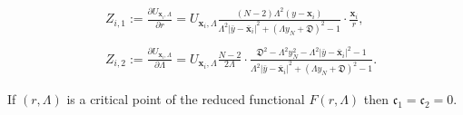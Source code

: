 \documentclass[10pt,a4paper]{amsart}
\begin{document}
\begin{align}\label{eq.Z_i_1_2_expansion_1}
  &Z_{i,1} := \frac{\partial U_{\mathbf{x}_i,\Lambda}}{\partial r} = U_{\mathbf{x}_i,\Lambda}\frac{(N-2)\Lambda^2 \left(y-\mathbf{x}_i\right)}{{\Lambda^2|\bar{y}-\bar{\mathbf{x}}_{i}|}^2+{(\Lambda y_N+ \mathfrak{D})}^2-1} \cdot \frac{\mathbf{x}_i}{r},\\\nonumber\\ \label{eq.Z_i_1_2_expansion_2}
  &Z_{i,2} := \frac{\partial U_{\mathbf{x}_i,\Lambda}}{\partial \Lambda} =U_{\mathbf{x}_i,\Lambda} \frac{N-2}{2\Lambda} \cdot \frac{\mathfrak{D}^2-\Lambda^2 y_N^2-\Lambda^2\left|\bar{y}-\bar{\mathbf{x}}_i\right|^2-1}{{\Lambda^2|\bar{y}-\bar{\mathbf{x}}_{i}|}^2+{(\Lambda y_N+ \mathfrak{D})}^2-1}.
\end{align}

\begin{proposition}
If $(r, \Lambda)$ is a critical point of the reduced functional $F(r, \Lambda)$ then $\mathfrak c_1=\mathfrak c_2=0$.
\end{proposition}
\end{document}
